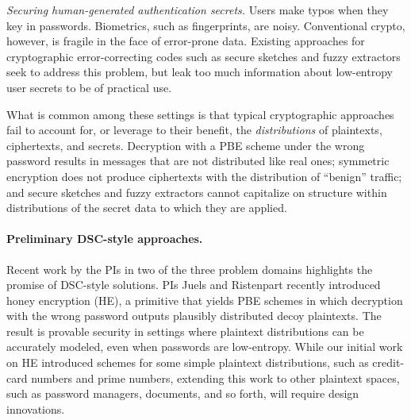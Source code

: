 {{\begin{newitemize}
\item{\em Securing human-generated authentication secrets.} Users make typos
when they key in passwords. Biometrics, such as fingerprints, are noisy.
Conventional crypto, however, is fragile in the face of error-prone data. 
Existing approaches for cryptographic error-correcting codes such as secure
sketches and fuzzy extractors~\cite{DORS08} seek to address this problem, but leak too much
information about low-entropy user secrets to be of practical use.
\end{newitemize}
What is common among these settings is that 
typical cryptographic approaches fail to account for, or leverage to
their benefit, the \textit{distributions} of plaintexts, ciphertexts, and
secrets.
Decryption with a PBE scheme under the wrong
password results in messages that are not distributed like real ones; symmetric
encryption does not produce ciphertexts with the distribution of ``benign''
traffic; and secure sketches and fuzzy extractors cannot capitalize on structure within
distributions of the secret data to which they are applied. 

\paragraph{Preliminary DSC-style approaches.}
Recent work by the PIs in two of the three problem domains highlights the
promise of DSC-style solutions. PIs Juels and Ristenpart recently introduced
honey encryption (HE), a primitive that yields PBE schemes in which decryption with the
wrong password outputs plausibly distributed decoy plaintexts. The result is provable security in settings where plaintext distributions can be accurately modeled, even when passwords are low-entropy.  While our initial  work on HE introduced
schemes for some simple plaintext distributions, such as
credit-card numbers and prime numbers, extending this work to
other plaintext spaces, such as password managers, documents, and so forth, will require design innovations.

}}
